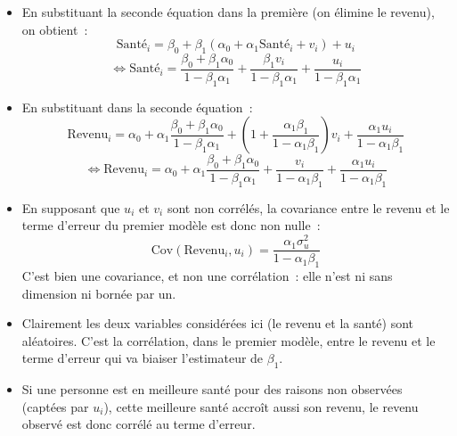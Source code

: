 \documentclass[10pt,a4paper]{article}
\theoremstyle{definition}
\renewcommand{\newline}{\unskip\par\vspace{1.5pt}}
\begin{document}
\begin{notes}

  \begin{itemize}

  \item En substituant la seconde équation dans la première (on élimine le
    revenu), on obtient~:
    \[
      \text{Santé}_i = \beta_0 + \beta_1\left( \alpha_0+\alpha_1\text{Santé}_i+v_i\right)+u_i
    \]
    \[
      \Leftrightarrow \text{Santé}_i = \frac{\beta_0+\beta_1\alpha_0}{1-\beta_1\alpha_1} + \frac{\beta_1 v_i}{1-\beta_1\alpha_1} + \frac{u_i}{1-\beta_1\alpha_1}
    \]
  \item En substituant dans la seconde équation~:
    \[
      \text{Revenu}_i = \alpha_0 + \alpha_1\frac{\beta_0+\beta_1\alpha_0}{1-\beta_1\alpha_1} + \left( 1 + \frac{\alpha_1\beta_1}{1-\alpha_1\beta_1}\right)v_i  + \frac{\alpha_1u_i}{1-\alpha_1\beta_1}
    \]
    \[
      \Leftrightarrow\text{Revenu}_i = \alpha_0 + \alpha_1\frac{\beta_0+\beta_1\alpha_0}{1-\beta_1\alpha_1}  + \frac{v_i}{1-\alpha_1\beta_1}  + \frac{\alpha_1u_i}{1-\alpha_1\beta_1}
    \]

  \item En supposant que $u_i$ et $v_i$ sont non corrélés, la covariance entre le
    revenu et le terme d'erreur du premier modèle est donc non nulle~:
    \[
      \mathrm{Cov}\left( \text{Revenu}_i, u_i \right) = \frac{\alpha_1\sigma_u^2}{1-\alpha_1\beta_1}
    \]
    C'est bien une covariance, et non une corrélation~: elle n'est ni sans
    dimension ni bornée par un.\newline

  \item Clairement les deux variables considérées ici (le revenu et la santé)
    sont aléatoires. C'est la corrélation, dans le premier modèle, entre le
    revenu et le terme d'erreur qui va biaiser l'estimateur de $\beta_1$.\newline

  \item Si une personne est en meilleure santé pour des raisons non observées
    (captées par $u_i$), cette meilleure santé accroît aussi son revenu, le
    revenu observé est donc corrélé au terme d'erreur.

  \end{itemize}

\end{notes}
\end{document}
